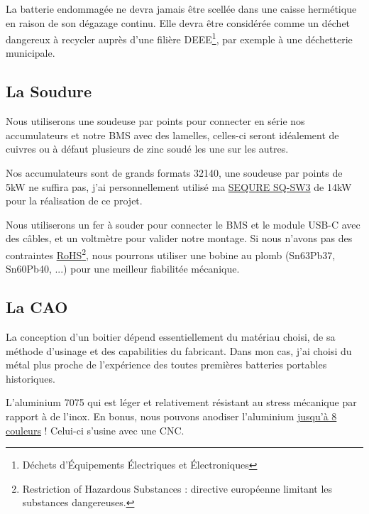 \documentclass[a4paper,11pt]{article}
\begin{document}
\begin{blogmain}
La batterie endommagée ne devra jamais être scellée dans une caisse hermétique en raison de son dégazage continu. Elle devra être considérée comme un déchet dangereux à recycler auprès d'une filière DEEE\footnote{Déchets d'Équipements Électriques et Électroniques}, par exemple à une déchetterie municipale.

\subsection{La Soudure}
Nous utiliserons une soudeuse par points pour connecter en série nos accumulateurs et notre BMS avec des lamelles, celles-ci seront idéalement de cuivres ou à défaut plusieurs de zinc soudé les une sur les autres.

Nos accumulateurs sont de grands formats 32140, une soudeuse par points de 5kW ne suffira pas, j'ai personnellement utilisé ma \href{https://sequremall.com/products/sequre-sw3-energy-storage-spotwelder-lithium-battery-spotwelding}{SEQURE SQ-SW3} de 14kW pour la réalisation de ce projet.


Nous utiliserons un fer à souder pour connecter le BMS et le module USB-C avec des câbles, et un voltmètre pour valider notre montage.
Si nous n'avons pas des contraintes \href{https://eur-lex.europa.eu/eli/dir/2011/65/oj/eng}{RoHS}\footnote{Restriction of Hazardous Substances : directive européenne limitant les substances dangereuses.}, nous pourrons utiliser une bobine au plomb (Sn63Pb37, Sn60Pb40, ...) pour une meilleur fiabilitée mécanique.


\subsection{La CAO}
La conception d'un boitier dépend essentiellement du matériau choisi, de sa méthode d'usinage et des capabilities du fabricant.
Dans mon cas, j'ai choisi du métal plus proche de l'expérience des toutes premières batteries portables historiques.

L'aluminium 7075 qui est léger et relativement résistant au stress mécanique par rapport à de l'inox. En bonus, nous pouvons anodiser l'aluminium \href{https://x.com/JLCCNC_Official/status/2011677881555173884}{jusqu'à 8 couleurs} !
Celui-ci s'usine avec une CNC.


\end{blogmain}
\end{document}
